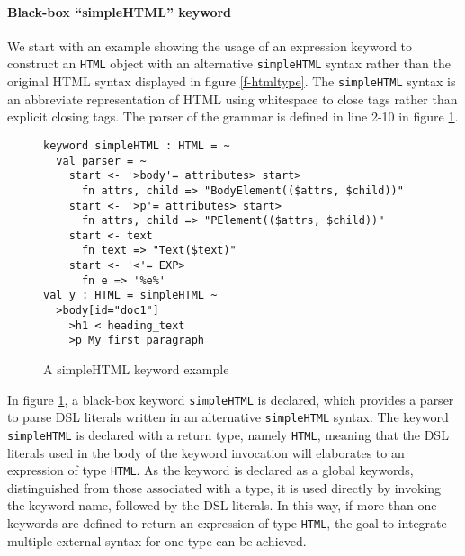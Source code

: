 \documentclass{sig-alternate}
\begin{document}
\paragraph{Black-box ``simpleHTML'' keyword}
We start with an example showing the usage of an expression keyword to construct an \verb|HTML| object with an alternative \verb|simpleHTML| syntax rather than the original HTML syntax displayed in figure \ref{f-htmltype}. The \verb|simpleHTML| syntax is an abbreviate representation of HTML using whitespace to close tags rather than explicit closing tags. The parser of the grammar is defined in line 2-10 in figure \ref{f-simplehtml}.
\begin{figure}[ht]
\begin{lstlisting}[style=wyvern]
keyword simpleHTML : HTML = ~
  val parser = ~
    start <- '>body'= attributes> start>
      fn attrs, child => "BodyElement(($attrs, $child))"
    start <- '>p'= attributes> start>
      fn attrs, child => "PElement(($attrs, $child))"
    start <- text
      fn text => "Text($text)"
    start <- '<'= EXP>
      fn e => '%e%'
val y : HTML = simpleHTML ~
  >body[id="doc1"]
    >h1 < heading_text
    >p My first paragraph
\end{lstlisting}
\vspace{-8px}
\caption{A simpleHTML keyword example}
\vspace{-10px}
\label{f-simplehtml}
\end{figure}

In figure \ref{f-simplehtml}, a black-box keyword \texttt{simpleHTML} is declared, which provides a parser to parse DSL literals written in an alternative \verb|simpleHTML| syntax. The keyword \texttt{simpleHTML} is declared with a return type, namely \texttt{HTML}, meaning that the DSL literals used in the body of the keyword invocation will elaborates to an expression of type \texttt{HTML}. As the keyword is declared as a global keywords, distinguished from those associated with a type, it is used directly by invoking the keyword name, followed by the DSL literals. In this way, if more than one keywords are defined to return an expression of type \verb|HTML|, the goal to integrate multiple external syntax for one type can be achieved.
\end{document}
